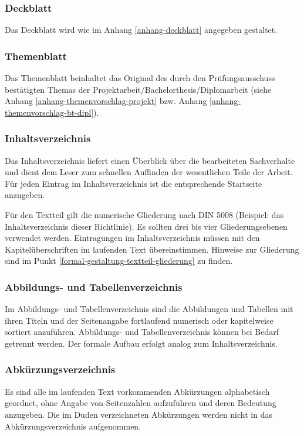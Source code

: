 \subsubsection{Deckblatt}
\label{formal-gestaltung-aufbau-deckblatt}
Das Deckblatt wird wie im Anhang \ref{anhang-deckblatt} angegeben gestaltet.

\subsubsection{Themenblatt}
\label{formal-gestaltung-aufbau-themenblatt}
Das Themenblatt beinhaltet das Original des durch den Prüfungsausschuss bestätigten Themas der Projektarbeit/Bachelorthesis/Diplomarbeit (siehe Anhang \ref{anhang-themenvorschlag-projekt} bzw. Anhang \ref{anhang-themenvorschlag-bt-dipl}).

\subsubsection{Inhaltsverzeichnis}
\label{formal-gestaltung-aufbau-inhaltsverzeichnis}
Das Inhaltsverzeichnis liefert einen Überblick über die bearbeiteten Sachverhalte und dient dem Leser zum schnellen Auffinden der wesentlichen Teile der Arbeit.
Für jeden Eintrag im Inhaltsverzeichnis ist die entsprechende Startseite anzugeben.

Für den Textteil gilt die numerische Gliederung nach DIN 5008 (Beispiel: das Inhaltsverzeichnis dieser Richtlinie).
Es sollten drei bis vier Gliederungsebenen verwendet werden.
Eintragungen im Inhaltsverzeichnis müssen mit den Kapitelüberschriften im
laufenden Text übereinstimmen.
Hinweise zur Gliederung sind im Punkt \ref{formal-gestaltung-textteil-gliederung} zu finden.

\subsubsection{Abbildungs- und Tabellenverzeichnis}
\label{formal-gestaltung-aufbau-abbild-tab-verz}
Im Abbildungs- und Tabellenverzeichnis sind die Abbildungen und Tabellen mit ihren Titeln und der Seitenangabe fortlaufend numerisch oder kapitelweise sortiert anzuführen.
Abbildungs- und Tabellenverzeichnis können bei Bedarf getrennt werden.
Der formale Aufbau erfolgt analog zum Inhaltsverzeichnis.

\subsubsection{Abkürzungsverzeichnis}
\label{formal-gestaltung-aufbau-acro-verz}
Es sind alle im laufenden Text vorkommenden Abkürzungen alphabetisch geordnet, ohne Angabe von Seitenzahlen aufzuführen und deren Bedeutung anzugeben.
Die im Duden verzeichneten Abkürzungen werden nicht in das  Abkürzungsverzeichnis aufgenommen.

